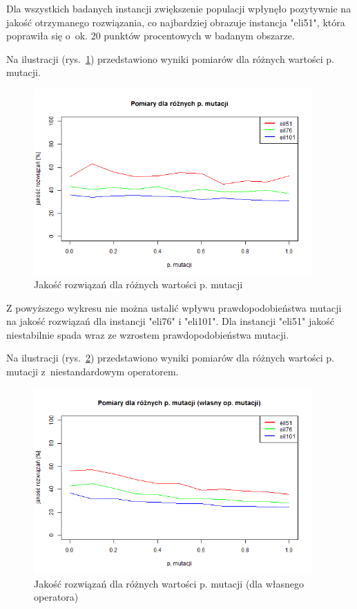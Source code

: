 \documentclass[11pt, a4paper]{article}
\newcommand{\fbi}{\leavevmode{\parindent=1em\indent}}
\begin{document}
\fbi
Dla wszystkich badanych instancji zwiększenie populacji wpłynęło pozytywnie na jakość otrzymanego rozwiązania, co najbardziej obrazuje instancja "eli51", która poprawiła się o~ok. 20 punktów procentowych w badanym obszarze.


\fbi
Na ilustracji (rys.~\ref{fig:tspmut}) przedstawiono wyniki pomiarów dla różnych wartości p. mutacji.

\begin{figure}[H]
	\centering
	\includegraphics[width=0.95\textwidth]{./assets/tsp_mut.png}
	\caption{Jakość rozwiązań dla różnych wartości p. mutacji}
	\label{fig:tspmut}
\end{figure}

\fbi
Z powyższego wykresu nie można ustalić wpływu prawdopodobieństwa mutacji na jakość rozwiązań dla instancji "eli76" i "eli101". Dla instancji "eli51" jakość niestabilnie spada wraz ze wzrostem prawdopodobieństwa mutacji.


\fbi
Na ilustracji (rys.~\ref{fig:tspmutcust}) przedstawiono wyniki pomiarów dla różnych wartości p. mutacji z~niestandardowym operatorem.

\begin{figure}[H]
	\centering
	\includegraphics[width=0.95\textwidth]{./assets/tsp_mut_custom.png}
	\caption{Jakość rozwiązań dla różnych wartości p. mutacji (dla własnego operatora)}
	\label{fig:tspmutcust}
\end{figure}
\end{document}
